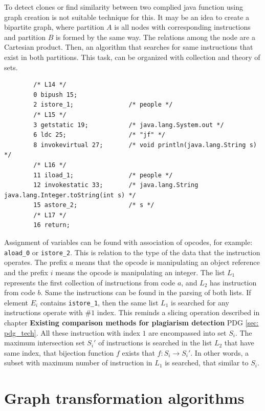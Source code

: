 \documentclass{report}
\begin{document}
To detect clones or find similarity between two complied java function using graph creation is not suitable technique for this. It may be an idea to create a bipartite graph, where partition $A$ is all nodes with corresponding instructions and partition $B$ is formed by the same way. The relations among the node are a Cartesian product. Then, an algorithm that searches for same instructions that exist in both partitions. This task, can be organized with collection and theory of sets.
\begin{lstlisting}
        /* L14 */
        0 bipush 15;
        2 istore_1;               /* people */
        /* L15 */
        3 getstatic 19;           /* java.lang.System.out */
        6 ldc 25;                 /* "jf" */
        8 invokevirtual 27;       /* void println(java.lang.String s) */
        /* L16 */
        11 iload_1;               /* people */
        12 invokestatic 33;       /* java.lang.String java.lang.Integer.toString(int s) */
        15 astore_2;              /* s */
        /* L17 */
        16 return;
\end{lstlisting}

Assignment of variables can be found with association of opcodes, for example: \texttt{aload\_0} or \texttt{istore\_2}. 
This is relation to the type of the data that the instruction operates. The prefix $a$ means that the opcode is manipulating an object reference and the prefix $i$ means the opcode is manipulating an integer. 
The list $ L_{1}$ represents the first collection of instructions from code $a$, and $L_{2}$ has instruction from code $b$. 
Same the instructions can be found in the parsing of both lists.
If element $E_{i}$ contains \texttt{istore\_1}, then the same list $L_{1}$ is searched for any instructions operate with $\#1$ index. This reminds a slicing operation described in chapter \textbf{Existing comparison methods for plagiarism detection} PDG \ref{sec: pdg_tech}. All these instruction with index $1$ are encompassed into set $S_{i}$. The maximum intersection set $S_{i}'$ of instructions is searched in the list $L_{2}$ that have same index, that bijection function $f$ exists that $f: S_{i} \rightarrow S_{i}'$. In other words, a subset with maximum number of instruction in $L_{1}$ is searched, that similar to $S_{i}$.



\chapter{Graph transformation algorithms}
\label{cha:graph-transformation}
\end{document}
